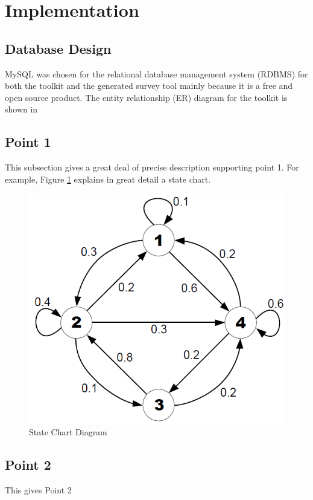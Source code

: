 \section{Implementation}												
\label{sec:Implementation}

\subsection{Database Design} 
MySQL was chosen for the relational database management system (RDBMS) for both the toolkit and the generated survey tool mainly because it is a free and open source product. The entity relationship (ER) diagram for the toolkit is shown in 

\subsection{Point 1}
This subsection gives a great deal of precise description supporting point 1.  For example,
Figure \ref{State Chart} explains in great detail a state chart.

\begin{figure}[htb]
\centering
\includegraphics[width=.5\textwidth]{section01/assets/sample_image.png}
\caption[Short Caption]{\label{State Chart}State Chart Diagram}
\end{figure}

\subsection{Point 2}
This gives Point 2
